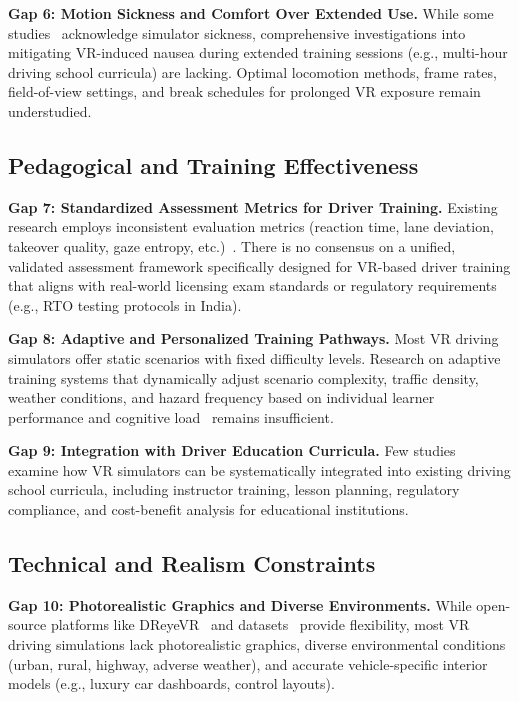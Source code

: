 \textbf{Gap 6: Motion Sickness and Comfort Over Extended Use.} While some studies~\cite{Lindal2019,Trofimova2021,Weidner2017} acknowledge simulator sickness, comprehensive investigations into mitigating VR-induced nausea during extended training sessions (e.g., multi-hour driving school curricula) are lacking. Optimal locomotion methods, frame rates, field-of-view settings, and break schedules for prolonged VR exposure remain understudied.

\subsection{Pedagogical and Training Effectiveness}
\textbf{Gap 7: Standardized Assessment Metrics for Driver Training.} Existing research employs inconsistent evaluation metrics (reaction time, lane deviation, takeover quality, gaze entropy, etc.)~\cite{Harari2021,Hwang2020,Chung2022,Zhang2022}. There is no consensus on a unified, validated assessment framework specifically designed for VR-based driver training that aligns with real-world licensing exam standards or regulatory requirements (e.g., RTO testing protocols in India).

\textbf{Gap 8: Adaptive and Personalized Training Pathways.} Most VR driving simulators offer static scenarios with fixed difficulty levels. Research on adaptive training systems that dynamically adjust scenario complexity, traffic density, weather conditions, and hazard frequency based on individual learner performance and cognitive load~\cite{Abdurrahman2021,Ju2024} remains insufficient.

\textbf{Gap 9: Integration with Driver Education Curricula.} Few studies~\cite{He2022} examine how VR simulators can be systematically integrated into existing driving school curricula, including instructor training, lesson planning, regulatory compliance, and cost-benefit analysis for educational institutions.

\subsection{Technical and Realism Constraints}
\textbf{Gap 10: Photorealistic Graphics and Diverse Environments.} While open-source platforms like DReyeVR~\cite{Silvera2022} and datasets~\cite{Yao2020} provide flexibility, most VR driving simulations lack photorealistic graphics, diverse environmental conditions (urban, rural, highway, adverse weather), and accurate vehicle-specific interior models (e.g., luxury car dashboards, control layouts).

